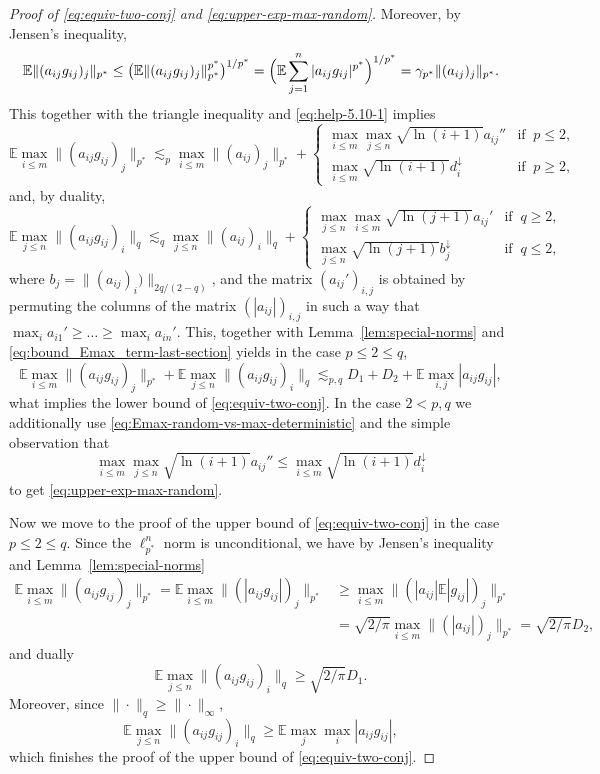 \documentclass[a4paper]{amsart}
\theoremstyle{definition}
\theoremstyle{remark}
\numberwithin{equation}{section}
\newcommand*{\EE}{\mathbb{E}}
\newcommand*{\rearr}{\downarrow} %
\begin{document}
\begin{proof}[Proof of \eqref{eq:equiv-two-conj} and \eqref{eq:upper-exp-max-random}]
 	Moreover, by Jensen's inequality,
	\[
		\EE  \|(a_{ij}g_{ij})_j\|_{p^\ast} \le \bigl(\EE  \|(a_{ij}g_{ij})_j\|_{p^\ast}^{p^\ast} \bigr)^{1/p^\ast} =  \Bigl(\EE \sum_{j=1}^n |a_{ij}g_{ij}|^{p^\ast}\Bigr)^{1/p^\ast} =\gamma_{p^\ast}  \|(a_{ij})_j\|_{p^\ast}.
	\]
	This together with the triangle inequality and  \eqref{eq:help-5.10-1} implies
	\[
		\EE \max_{i\le m}  \|(a_{ij}g_{ij})_j\|_{p^\ast} \lesssim_{p} \max_{i\le m}\|(a_{ij})_j\|_{p^\ast} + \begin{cases}
\max_{i\le m} \max_{j\le n}   \sqrt{\ln(i+1)} a_{ij}'' &  \text{if }\  p\leq 2,\\
  \max_{i\le m} \sqrt{\ln(i+1)}d_i^{\rearr{}} &   \text{if } \ p\ge 2,
   \end{cases} 
	\]
	and, by duality, 
	\[
		\EE \max_{j\le n}  \|(a_{ij}g_{ij})_i\|_{q} \lesssim_{q} \max_{j\le n}\|(a_{ij})_i\|_{q} + \begin{cases}
 \max_{j\le n}\max_{i\le m}   \sqrt{\ln(j+1)} a_{ij}' &  \text{if }\  q\ge 2,\\
  \max_{j\le n} \sqrt{\ln(j+1)}b_j^{\rearr{}} &   \text{if } \ q\le 2,
   \end{cases} 
	\]
	where $b_j=\|(a_{ij})_i)\|_{2q/(2-q)}$, and the matrix $(a_{ij}')_{i,j}$ is obtained by permuting the columns of the matrix $(|a_{ij}|)_{i,j}$ in such a way that $\max_i a_{i1}'\ge \dots \ge \max_i a_{in}'$.
	This, together with Lemma~\ref{lem:special-norms} and \eqref{eq:bound_Emax_term-last-section}  yields in the case $p\le 2\le q$,
	\[
		\EE \max_{i\le m}  \|(a_{ij}g_{ij})_j\|_{p^\ast}  + \EE \max_{j\le n}  \|(a_{ij}g_{ij})_i\|_{q} \lesssim_{p,q} D_1+D_2 + \EE\max_{i,j} |a_{ij}g_{ij}|,
	\]
	what implies the lower bound of \eqref{eq:equiv-two-conj}.
	 In the case $2<p, q$ we additionally use \eqref{eq:Emax-random-vs-max-deterministic} and the simple observation that 
	 \[
	 	\max_{i\le m} \max_{j\le n}   \sqrt{\ln(i+1)} a_{ij}''  \le   \max_{i\le m} \sqrt{\ln(i+1)}d_i^{\rearr{}} 	\]
	to get \eqref{eq:upper-exp-max-random}.

	Now we move to the proof of the upper bound of \eqref{eq:equiv-two-conj} in the case $p\le 2\le q$. Since the $\ell_{p^\ast}^n$ norm is unconditional, we have by Jensen's inequality and Lemma~\ref{lem:special-norms}
	\begin{align*}
		\EE  \max_{i\le m}  \|(a_{ij}g_{ij})_j\|_{p^\ast}  
		=\EE  \max_{i\le m}  \|(|a_{ij}g_{ij}|)_j\|_{p^\ast}
		 &\ge   \max_{i\le m}   \|(|a_{ij}|\EE|g_{ij}|)_j\|_{p^\ast} 
		\\ &=\sqrt{2/\pi}   \max_{i\le m}   \|(|a_{ij}|)_j\|_{p^\ast} 
		=\sqrt{2/\pi}  D_2 ,
	\end{align*}
	and dually
	\begin{equation*}
		\EE  \max_{j\le n}  \|(a_{ij}g_{ij})_i\|_{q}  
		 \ge  
		 \sqrt{2/\pi}   D_1.
	\end{equation*}
	Moreover, since $\|\cdot\|_q\ge \|\cdot\|_{\infty}$,
	\[
		\EE  \max_{j\le n}  \|(a_{ij}g_{ij})_i\|_{q}  \ge \EE\max_{j} \max_{i} |a_{ij}g_{ij}|,
	\]
	which finishes the proof of the upper bound of \eqref{eq:equiv-two-conj}.
	\end{proof}
\end{document}
